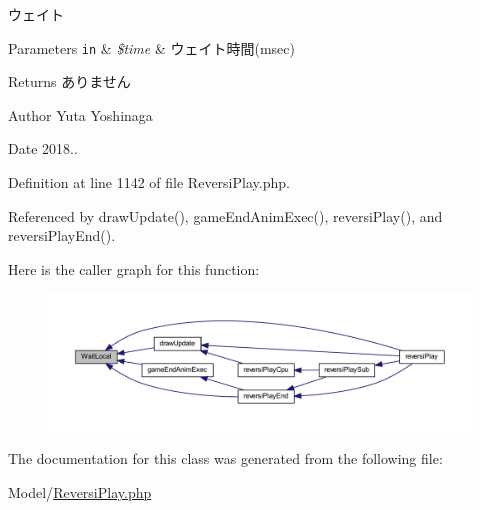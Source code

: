 ウェイト 


\begin{DoxyParams}[1]{Parameters}
\mbox{\tt in}  & {\em \$time} & ウェイト時間(msec) \\
\hline
\end{DoxyParams}
\begin{DoxyReturn}{Returns}
ありません 
\end{DoxyReturn}
\begin{DoxyAuthor}{Author}
Yuta Yoshinaga 
\end{DoxyAuthor}
\begin{DoxyDate}{Date}
2018.. 
\end{DoxyDate}


Definition at line 1142 of file Reversi\+Play.\+php.



Referenced by draw\+Update(), game\+End\+Anim\+Exec(), reversi\+Play(), and reversi\+Play\+End().

Here is the caller graph for this function\+:\nopagebreak
\begin{figure}[H]
\begin{center}
\leavevmode
\includegraphics[width=350pt]{class_reversi_play_a58884d8de55d9faeac653fcf6d4f48b3_icgraph}
\end{center}
\end{figure}


The documentation for this class was generated from the following file\+:\begin{DoxyCompactItemize}
\item 
Model/\hyperlink{_reversi_play_8php}{Reversi\+Play.\+php}\end{DoxyCompactItemize}
